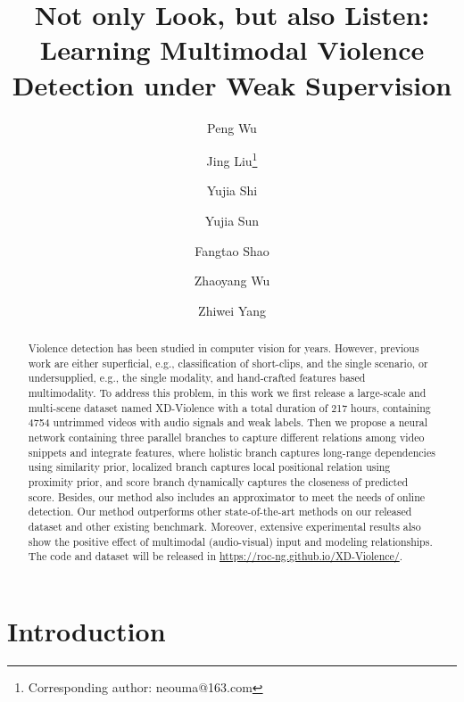 \documentclass[runningheads]{llncs}
\begin{document}
\pagestyle{headings}
\mainmatter
\def\ECCVSubNumber{7476}  

\title{Not only Look, but also Listen: Learning Multimodal Violence Detection under Weak Supervision} 



\author{Peng Wu \and
Jing Liu\thanks{Corresponding author: neouma@163.com}  \and
Yujia Shi \and
Yujia Sun \and
Fangtao Shao \and
Zhaoyang Wu \and
Zhiwei Yang}

\maketitle

\begin{abstract}
Violence detection has been studied in computer vision for years. However, previous work are either superficial, e.g., classification of short-clips, and the single scenario, or undersupplied, e.g., the single modality, and hand-crafted features based multimodality. To address this problem, in this work we first release a large-scale and multi-scene dataset named XD-Violence with a total duration of 217 hours, containing 4754 untrimmed videos with audio signals and weak labels. Then we propose a neural network containing three parallel branches to capture different relations among video snippets and integrate features, where holistic branch captures long-range dependencies using similarity prior, localized branch captures local positional relation using proximity prior, and score branch dynamically captures the closeness of predicted score. Besides, our method also includes an approximator to meet the needs of online detection. Our method outperforms other state-of-the-art methods on our released dataset and other existing benchmark. Moreover, extensive experimental results also show the positive effect of multimodal (audio-visual) input and modeling relationships. The code and dataset will be released in \href{https://roc-ng.github.io/XD-Violence/}{https://roc-ng.github.io/XD-Violence/}.
\end{abstract}


\section{Introduction}
\end{document}
